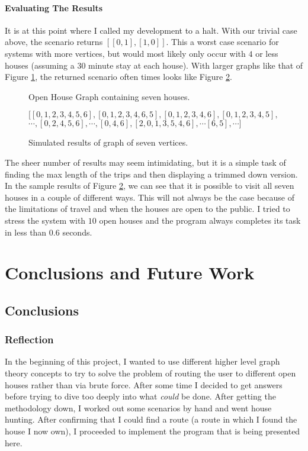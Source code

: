 \documentclass[letterpaper,11pt]{report}
\theoremstyle{definition}
\theoremstyle{definition}
\begin{document}
\subsubsection{Evaluating The Results}
It is at this point where I called my development to a halt. With our trivial case above, the scenario returns $[[0,1], [1,0]]$. This a worst case scenario for systems with more vertices, but would most likely only occur with $4$ or less houses (assuming a $30$ minute stay at each house). With larger graphs like that of Figure \ref{seven-houses}, the returned scenario often times looks like Figure \ref{seven-houses-results}.
\begin{figure}[!htb]
  \begin{center}
    
    \caption{Open House Graph containing seven houses.}\label{seven-houses}
  \end{center}
\end{figure}
\begin{figure}
  \begin{center}
    $[[0, 1, 2, 3, 4, 5, 6], [0, 1, 2, 3, 4, 6, 5], [0, 1, 2, 3, 4, 6], [0, 1, 2, 3, 4, 5],$\\ $\cdots, [0, 2, 4, 5, 6], \cdots, [0, 4, 6], [2, 0, 1, 3, 5, 4, 6], \cdots [6, 5], \cdots]$
  \end{center}
  \caption{Simulated results of graph of seven vertices.}\label{seven-houses-results}
\end{figure}

The sheer number of results may seem intimidating, but it is a simple task of finding the max length of the trips and then displaying a trimmed down version. In the sample results of Figure \ref{seven-houses-results}, we can see that it is possible to visit all seven houses in a couple of different ways. This will not always be the case because of the limitations of travel and when the houses are open to the public. I tried to stress the system with $10$ open houses and the program always completes its task in less than $0.6$ seconds.

\chapter{Conclusions and Future Work}
\section{Conclusions}
\subsection{Reflection}
In the beginning of this project, I wanted to use different higher level graph theory concepts to try to solve the problem of routing the user to different open houses rather than via brute force. After some time I decided to get answers before trying to dive too deeply into what \textit{could} be done. After getting the methodology down, I worked out some scenarios by hand and went house hunting. After confirming that I could find a route (a route in which I found the house I now own), I proceeded to implement the program that is being presented here.
\end{document}
